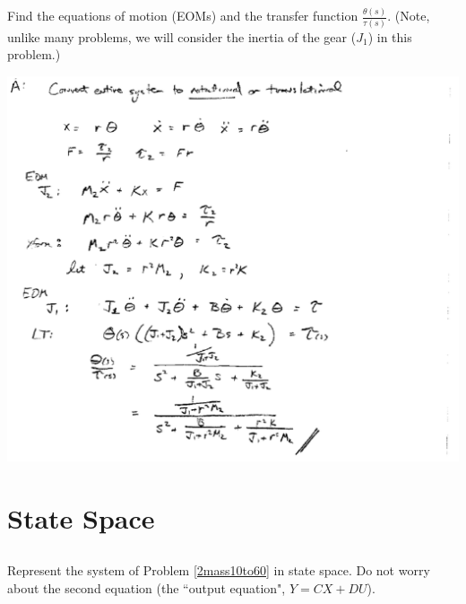 \documentclass{article}	%
\begin{document}
Find the equations of motion (EOMs)  and the transfer function  $\frac{\theta(s)}{\tau(s)}$. (Note, unlike many problems, we will consider the inertia of the gear ($J_1$) in this problem.)

\begin{solution}
\includegraphics[width=6.25in]{00947a.png}
\end{solution}





\section*{State Space}

\subsection{}\label{ICPss_1mass}
\subsubsection{}
Represent the system of Problem \ref{2mass10to60} in state space. Do not worry about the second
equation (the ``output equation", $Y = CX+DU$).
\end{document}
